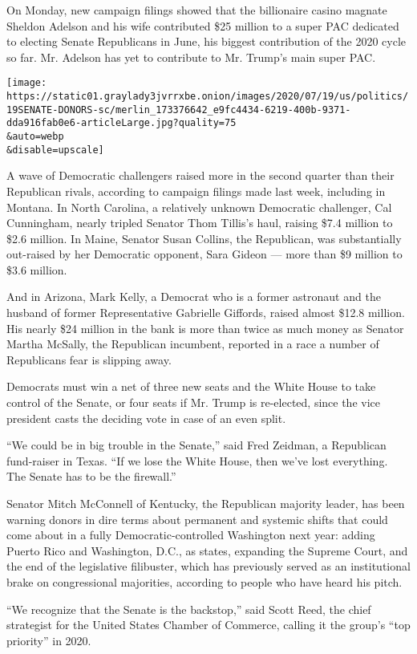 On Monday, new campaign filings showed that the billionaire casino
magnate Sheldon Adelson and his wife contributed \$25 million to a super
PAC dedicated to electing Senate Republicans in June, his biggest
contribution of the 2020 cycle so far. Mr. Adelson has yet to contribute
to Mr. Trump's main super PAC.

\texttt{[image: https://static01.graylady3jvrrxbe.onion/images/2020/07/19/us/politics/19SENATE-DONORS-sc/merlin\_173376642\_e9fc4434-6219-400b-9371-dda916fab0e6-articleLarge.jpg?quality=75\\\&auto=webp\\\&disable=upscale]}

A wave of Democratic challengers raised more in the second quarter than
their Republican rivals, according to campaign filings made last week,
including in Montana. In North Carolina, a relatively unknown Democratic
challenger, Cal Cunningham, nearly tripled Senator Thom Tillis's haul,
raising \$7.4 million to \$2.6 million. In Maine, Senator Susan Collins,
the Republican, was substantially out-raised by her Democratic opponent,
Sara Gideon --- more than \$9 million to \$3.6 million.

And in Arizona, Mark Kelly, a Democrat who is a former astronaut and the
husband of former Representative Gabrielle Giffords, raised almost
\$12.8 million. His nearly \$24 million in the bank is more than twice
as much money as Senator Martha McSally, the Republican incumbent,
reported in a race a number of Republicans fear is slipping away.

Democrats must win a net of three new seats and the White House to take
control of the Senate, or four seats if Mr. Trump is re-elected, since
the vice president casts the deciding vote in case of an even split.

``We could be in big trouble in the Senate,'' said Fred Zeidman, a
Republican fund-raiser in Texas. ``If we lose the White House, then
we've lost everything. The Senate has to be the firewall.''

Senator Mitch McConnell of Kentucky, the Republican majority leader, has
been warning donors in dire terms about permanent and systemic shifts
that could come about in a fully Democratic-controlled Washington next
year: adding Puerto Rico and Washington, D.C., as states, expanding the
Supreme Court, and the end of the legislative filibuster, which has
previously served as an institutional brake on congressional majorities,
according to people who have heard his pitch.

``We recognize that the Senate is the backstop,'' said Scott Reed, the
chief strategist for the United States Chamber of Commerce, calling it
the group's ``top priority'' in 2020.


